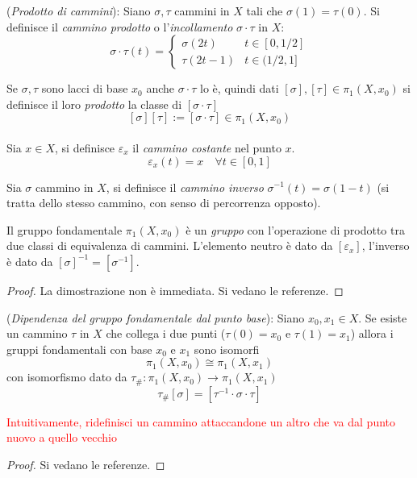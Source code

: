 \begin{definition}(\emph{Prodotto di cammini}):
   Siano $\sigma,\tau$ cammini in $X$ tali che $\sigma(1) = \tau(0)$. Si definisce
   il \emph{cammino prodotto} o l'\emph{incollamento} $\sigma \cdot \tau$ in $X$:
   \begin{equation}
      \sigma \cdot \tau (t) = \begin{cases}
         \sigma(2t) & t \in [0,1/2] \\
         \tau(2t-1) & t \in (1/2,1]
      \end{cases}
   \end{equation}
\end{definition}

Se $\sigma,\tau$ sono lacci di base $x_0$ anche $\sigma \cdot \tau$ lo è, quindi
dati $[\sigma],[\tau] \in \pi_1(X,x_0)$ si definisce il loro \emph{prodotto}
la classe di $[\sigma \cdot \tau]$
$$ [\sigma][\tau] := [\sigma\cdot\tau] \in \pi_1(X,x_0) $$\\

Sia $x \in X$, si definisce $\varepsilon_x$ il \emph{cammino costante} nel punto $x$.
$$\varepsilon_x(t) = x \quad \forall t \in[0,1]$$

Sia $\sigma$ cammino in $X$, si definisce il \emph{cammino inverso}
$\sigma^{-1}(t) = \sigma(1-t)$ (si tratta dello stesso cammino, con senso
di percorrenza opposto).

\begin{proposition}
   Il gruppo fondamentale $\pi_1(X,x_0)$ è un \emph{gruppo} con l'operazione di
   prodotto tra due classi di equivalenza di cammini.
   L'elemento neutro è dato da $[\varepsilon_x]$,
   l'inverso è dato da $[\sigma]^{-1} = [\sigma^{-1}]$.
\end{proposition}
\begin{proof}
   La dimostrazione non è immediata. Si vedano le referenze.
\end{proof}

\begin{proposition}(\emph{Dipendenza del gruppo fondamentale dal punto base}):
   Siano $x_0, x_1 \in X$. Se esiste un cammino $\tau$ in $X$ che collega i due
   punti ($\tau(0)=x_0$ e $\tau(1)=x_1$) allora i gruppi fondamentali con base
   $x_0$ e $x_1$ sono isomorfi
      $$ \pi_1(X,x_0) \cong \pi_1(X,x_1) $$
   con isomorfismo dato da $\tau_\# : \pi_1(X,x_0) \to \pi_1(X,x_1)$
      $$  \tau_\# [\sigma] = [\tau^{-1} \cdot \sigma \cdot \tau] $$
\end{proposition}
\textcolor{red}{Intuitivamente, ridefinisci un cammino attaccandone un altro che
va dal punto nuovo a quello vecchio}
\begin{proof} Si vedano le referenze. \end{proof}

